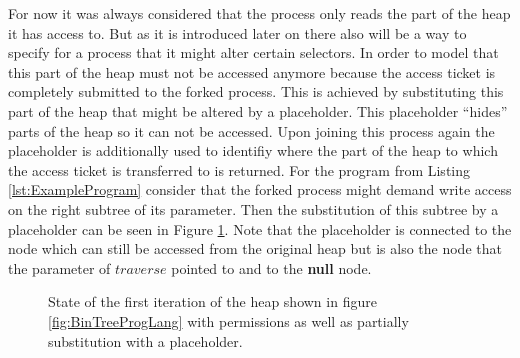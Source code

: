 	For now it was always considered that the process only reads the part of the
	heap it has access to. But as it is introduced later on there also will be a
	way to specify for a process that it might alter certain selectors. In order
	to model that this part of the heap must not be accessed anymore because the
	access ticket is completely submitted to the forked process. This is
	achieved by substituting this part of the heap that might be altered by a
	placeholder.
	This placeholder ``hides'' parts of the heap so it can not be accessed.
	Upon joining this process again the placeholder is additionally used to
	identifiy where the part of the heap to which the access ticket is
	transferred to is returned.
	For the program from Listing \ref{lst:ExampleProgram} consider that the
	forked process might demand write access on the right subtree of its
	parameter. Then the substitution of this subtree by a placeholder can be
	seen in Figure \ref{fig:BinTreeProgLangPermReplacement}. Note that the
	placeholder is connected to the node which can still be accessed from the
	original heap but is also the node that the parameter of $\mathit{traverse}$
	pointed to and to the \textbf{null} node.
	\begin{figure}
	\begin{center}\end{center}
		\caption{State of the first iteration of the heap shown in figure
			\ref{fig:BinTreeProgLang} with permissions as well as partially
		substitution with a placeholder.}
		\label{fig:BinTreeProgLangPermReplacement}
	\end{figure}
